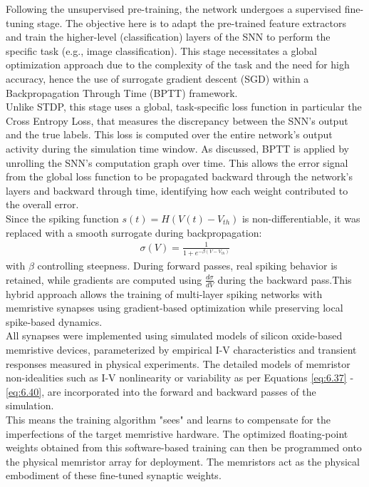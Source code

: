\noindent Following the unsupervised pre-training, the network undergoes a supervised fine-tuning stage. The objective here is to adapt the pre-trained feature extractors and train the higher-level (classification) layers of the SNN to perform the specific task (e.g., image classification). This stage necessitates a global optimization approach due to the complexity of the task and the need for high accuracy, hence the use of surrogate gradient descent (SGD) within a Backpropagation Through Time (BPTT) framework.\\

\noindent Unlike STDP, this stage uses a global, task-specific loss function in particular the Cross Entropy Loss, that measures the discrepancy between the SNN's output and the true labels. This loss is computed over the entire network's output activity during the simulation time window. As discussed, BPTT is applied by unrolling the SNN's computation graph over time. This allows the error signal from the global loss function to be propagated backward through the network's layers and backward through time, identifying how each weight contributed to the overall error.\\ 

\noindent Since the spiking function $s(t) = H(V(t) - V_{th})$ is non-differentiable, it was replaced with a smooth surrogate during backpropagation:
\begin{align}
    \sigma(V) = \frac{1}{1 + e^{-\beta(V - V_{th})}} \label{eq:6.41}
\end{align}
with $\beta$ controlling steepness. During forward passes, real spiking behavior is retained, while gradients are computed using $\frac{d\sigma}{dV}$ during the backward pass.This hybrid approach allows the training of multi-layer spiking networks with memristive synapses using gradient-based optimization while preserving local spike-based dynamics.\\

\noindent All synapses were implemented using simulated models of silicon oxide-based memristive devices, parameterized by empirical I-V characteristics and transient responses measured in physical experiments. The detailed models of memristor non-idealities such as I-V nonlinearity or variability as per Equations \ref{eq:6.37} - \ref{eq:6.40}, are incorporated into the forward and backward passes of the simulation. \\

\noindent This means the training algorithm "sees" and learns to compensate for the imperfections of the target memristive hardware. The optimized floating-point weights obtained from this software-based training can then be programmed onto the physical memristor array for deployment. The memristors act as the physical embodiment of these fine-tuned synaptic weights.\\

